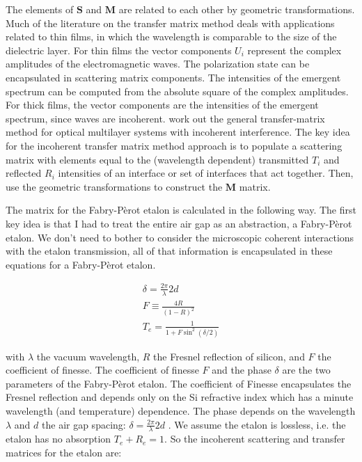 \documentclass[osajnl,preprint,showpacs,superscriptaddress,12pt]{revtex4-1} %
\begin{document}
The elements of $\boldsymbol{S}$ and $\boldsymbol{M}$ are related to each other by geometric transformations\cite{2007fuph.book.....S}.  Much of the literature on the transfer matrix method deals with applications related to thin films, in which the wavelength is comparable to the size of the dielectric layer.  For thin films the vector components $U_{i}$ represent the complex amplitudes of the electromagnetic waves.  The polarization state can be encapsulated in scattering matrix components\cite{2007fuph.book.....S}.  The intensities of the emergent spectrum can be computed from the absolute square of the complex amplitudes.  For thick films, the vector components are the intensities of the emergent spectrum, since waves are incoherent.  \cite{2002ApOpt..41.3978K} work out the general transfer-matrix method for optical multilayer systems with incoherent interference.  The key idea for the incoherent transfer matrix method approach is to populate a scattering matrix with elements equal to the (wavelength dependent) transmitted $T_i$ and reflected $R_i$ intensities of an interface or set of interfaces that act together.  Then, use the geometric transformations to construct the $\boldsymbol{M}$ matrix.  

The matrix for the Fabry-P\`erot etalon is calculated in the following way.  The first key idea is that I had to treat the entire air gap as an abstraction, a Fabry-P\`erot etalon.  We don't need to bother to consider the microscopic coherent interactions with the etalon transmission, all of that information is encapsulated in these equations for a Fabry-P\`erot etalon.

\begin{eqnarray}
 \delta = \frac{2\pi}{\lambda}2d \\
  F \equiv \frac{4R}{(1-R)^2} \\
 T_e = \frac{1}{1+F\sin^2(\delta/2)}  \label{eq:FabPerot}
\end{eqnarray}

with $\lambda$ the vacuum wavelength, $R$ the Fresnel reflection of silicon, and $F$ the coefficient of finesse.  The coefficient of finesse $F$ and the phase $\delta$ are the two parameters of the Fabry-P\`erot etalon.  The coefficient of Finesse encapsulates the Fresnel reflection and depends only on the Si refractive index which has a minute wavelength (and temperature) dependence.  The phase depends on the wavelength $\lambda$ and $d$ the air gap spacing: $\delta=\frac{2\pi}{\lambda}2d$ .  We assume the etalon is lossless, i.e. the etalon has no absorption $T_e+R_e=1$.  So the incoherent scattering and transfer matrices for the etalon are:
\end{document}
